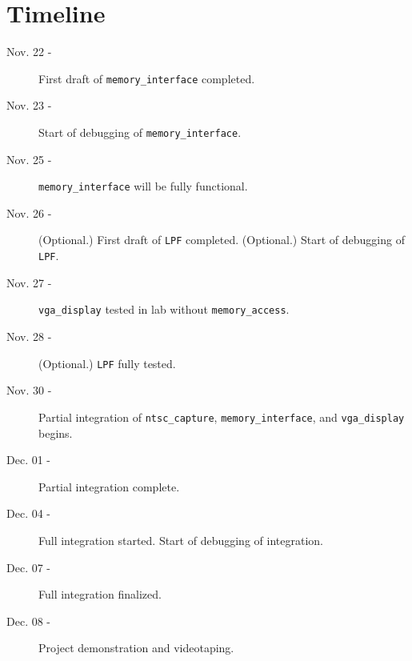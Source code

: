 \documentclass{article}
\begin{document}
\section{Timeline}
\begin{description}
\item[Nov. 22 -] First draft of {\tt memory\_interface} completed.
\item[Nov. 23 -] Start of debugging of {\tt memory\_interface}.
\item[Nov. 25 -] {\tt memory\_interface} will be fully functional.
\item[Nov. 26 -] (Optional.) First draft of {\tt LPF} completed. (Optional.) Start of debugging of {\tt LPF}.
\item[Nov. 27 -] {\tt vga\_display} tested in lab without {\tt memory\_access}.
\item[Nov. 28 -] (Optional.) {\tt LPF} fully tested.
\item[Nov. 30 -] Partial integration of {\tt ntsc\_capture}, {\tt memory\_interface}, and {\tt vga\_display} begins.
\item[Dec. 01 -] Partial integration complete.
\item[Dec. 04 -] Full integration started. Start of debugging of integration.
\item[Dec. 07 -] Full integration finalized.
\item[Dec. 08 -] Project demonstration and videotaping.
\end{description}
\end{document}
